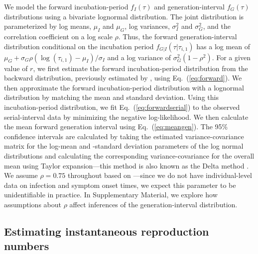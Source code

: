 \documentclass[12pt]{article}
\newcommand{\eref}[1]{Eq.~(\ref{eq:#1})}
\begin{document}
We model the forward incubation-period $f_I(\tau)$ and generation-interval $f_G(\tau)$ distributions using a bivariate lognormal distribution.
The joint distribution is parameterized by log means, $\mu_I$ and $\mu_G$, log variances, $\sigma_I^2$ and $\sigma_G^2$, and the correlation coefficient on a log scale $\rho$.
Thus, the forward generation-interval distribution conditional on the incubation period $f_{G|I}(\tau|\tau_{i,1})$ has a log mean of $\mu_G + \sigma_G \rho (\log(\tau_{i, 1}) - \mu_I)/\sigma_I$ and a log variance of $\sigma_G^2 (1 - \rho^2)$.
For a given value of $r$, we first estimate the forward incubation-period distribution from the backward distribution, previously estimated by \cite{backer2021omicron}, using \eref{forward}.
We then approximate the forward incubation-period distribution with a lognormal distribution by matching the mean and standard deviation.
Using this incubation-period distribution, we fit \eref{forwardserial} to the observed serial-interval data by minimizing the negative log-likelihood.
We then calculate the mean forward generation interval using \eref{meangen}.
The 95\% confidence intervals are calculated by taking the estimated variance-covariance matrix for the log-mean and -standard deviation parameters of the log normal distributions and calculating the corresponding variance-covariance for the overall mean using Taylor expansion---this method is also known as the Delta method \citep{oehlert1992note}.
We assume $\rho = 0.75$ throughout based on \cite{sender2021unmitigated}---since we do not have individual-level data on infection and symptom onset times, we expect this parameter to be unidentifiable in practice.
In Supplementary Material, we explore how assumptions about $\rho$ affect inferences of the generation-interval distribution.

\subsection{Estimating instantaneous reproduction numbers}
\end{document}
